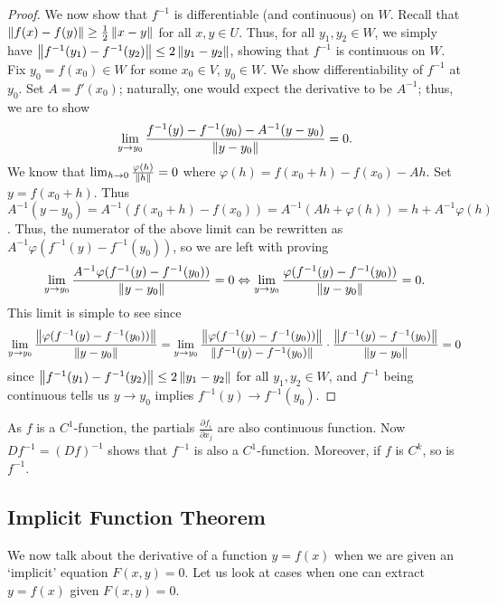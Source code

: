 \begin{proof}
    We now show that $f^{-1}$ is differentiable (and continuous) on $W$. Recall that $\left\lVert f(x)-f(y)\right\rVert \geq \frac{1}{2} \left\lVert x-y\right\rVert$ for all $x,y \in U$. Thus, for all $y_{1},y_{2} \in W$, we simply have $\left\lVert f^{-1}(y_{1})-f^{-1}(y_{2})\right\rVert \leq 2\left\lVert y_{1}-y_{2}\right\rVert$, showing that $f^{-1}$ is continuous on $W$. Fix $y_{0} = f(x_{0}) \in W$ for some $x_{0} \in V$, $y_{0} \in W$. We show differentiability of $f^{-1}$ at $y_{0}$. Set $A = f'(x_{0})$; naturally, one would expect the derivative to be $A^{-1}$; thus, we are to show
    \begin{align}
        \lim_{y \to y_{0}} \frac{f^{-1}(y)-f^{-1}(y_{0})-A^{-1}(y-y_{0})}{\left\lVert y-y_{0}\right\rVert} = 0.
    \end{align}
    We know that $\lim_{h \to 0} \frac{\varphi(h)}{\left\lVert h\right\rVert} = 0$ where $\varphi(h) = f(x_{0}+h)-f(x_{0})-A h$. Set $y = f(x_{0}+h)$. Thus $A^{-1}(y-y_{0}) = A^{-1}(f(x_{0}+h)-f(x_{0})) = A^{-1}(Ah + \varphi(h)) = h + A^{-1}\varphi(h)$. Thus, the numerator of the above limit can be rewritten as $A^{-1}\varphi(f^{-1}(y)-f^{-1}(y_{0}))$, so we are left with proving
    \begin{align}
        \lim_{y \to y_{0}} \frac{A^{-1}\varphi(f^{-1}(y)-f^{-1}(y_{0}))}{\left\lVert y-y_{0}\right\rVert} = 0 \Leftrightarrow \lim_{y \to y_{0}} \frac{\varphi(f^{-1}(y)-f^{-1}(y_{0}))}{\left\lVert y-y_{0}\right\rVert} = 0.
    \end{align}
    This limit is simple to see since
    \begin{align}
        \lim_{y \to y_{0}} \frac{\left\lVert\varphi(f^{-1}(y)-f^{-1}(y_{0}))\right\rVert}{\left\lVert y-y_{0}\right\rVert} = \lim_{y \to y_{0}} \frac{\left\lVert\varphi(f^{-1}(y)-f^{-1}(y_{0}))\right\rVert}{\left\lVert f^{-1}(y)-f^{-1}(y_{0})\right\rVert} \cdot \frac{\left\lVert f^{-1}(y)-f^{-1}(y_{0})\right\rVert}{\left\lVert y-y_{0}\right\rVert} = 0
    \end{align}
    since $\left\lVert f^{-1}(y_{1})-f^{-1}(y_{2})\right\rVert \leq 2\left\lVert y_{1}-y_{2}\right\rVert$ for all $y_{1},y_{2} \in W$, and $f^{-1}$ being continuous tells us $y \to y_{0}$ implies $f^{-1}(y) \to f^{-1}(y_{0})$.
\end{proof}

\begin{remark}
    As $f$ is a $C^{1}$-function, the partials $\frac{\partial f_{i}}{\partial x_{j}}$ are also continuous function. Now $Df^{-1} = (Df)^{-1}$ shows that $f^{-1}$ is also a $C^{1}$-function. Moreover, if $f$ is $C^{k}$, so is $f^{-1}$.
\end{remark}

\subsection{Implicit Function Theorem}
We now talk about the derivative of a function $y = f(x)$ when we are given an `implicit' equation $F(x,y) = 0$. Let us look at cases when one can extract $y=f(x)$ given $F(x,y) = 0$.

